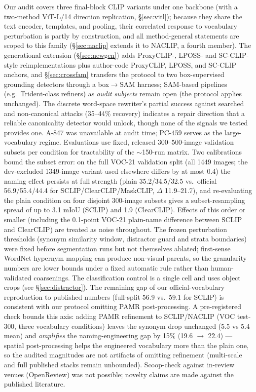\documentclass[11pt]{article}
\newcommand{\miou}{mIoU}
\begin{document}
Our audit covers three final-block CLIP variants under one backbone (with a
two-method ViT-L/14 direction replication, \S\ref{sec:vitl}); because they
share the text encoder, templates, and pooling, their correlated response to
vocabulary perturbation is partly by construction, and all method-general statements
are scoped to this family (\S\ref{sec:naclip} extends it to NACLIP, a fourth member).
The generational extension (\S\ref{sec:newgen}) adds ProxyCLIP-, LPOSS-
and SC-CLIP-style reimplementations plus author-code ProxyCLIP, LPOSS, and SC-CLIP anchors, and
\S\ref{sec:crossfam} transfers the protocol to two box-supervised grounding
detectors through a box$\to$SAM harness; SAM-based pipelines (e.g.\
Trident-class refiners) as \emph{audit subjects}
remain open (the protocol applies unchanged). The discrete word-space
rewriter's partial success against searched and non-canonical attacks
(35--44\% recovery) indicates a repair direction that a reliable
canonicality detector would unlock, though none of the signals we tested
provides one. A-847 was
unavailable at audit time; PC-459 serves as the large-vocabulary regime. Evaluations
use fixed, released 300--500-image validation subsets per condition for tractability
of the $\sim$150-run matrix. Two calibrations bound the subset error: on the full
VOC-21 validation split (all 1449 images; the dev-excluded 1349-image variant
used elsewhere differs by at most 0.4) the naming effect persists at full
strength (plain 35.2/34.5/32.5 vs.\ official 56.9/55.4/44.4 for
SCLIP/ClearCLIP/MaskCLIP,
$\Delta$ 11.9--21.7), and re-evaluating the plain condition on four disjoint 300-image
subsets gives a subset-resampling spread of up to 3.1 \miou{} (SCLIP) and 1.9
(ClearCLIP). Effects of this order or smaller (including the 0.1-point VOC-21
plain-name difference between SCLIP and ClearCLIP) are treated as noise throughout.
The frozen perturbation thresholds (synonym similarity window, distractor guard and
strata boundaries) were fixed before segmentation runs but not themselves ablated;
first-sense WordNet hypernym mapping can produce non-visual parents, so the
granularity numbers are lower bounds under a fixed automatic rule rather than
human-validated coarsenings. The classification control is a single cell and uses
object crops (see \S\ref{sec:distractor}). The remaining gap of our official-vocabulary
reproduction to published numbers (full-split 56.9 vs.\ 59.1 for SCLIP) is consistent
with our protocol omitting PAMR post-processing. A pre-registered check bounds
this axis: adding PAMR refinement to SCLIP/NACLIP (VOC test-300, three
vocabulary conditions) leaves the synonym drop unchanged (5.5 vs 5.4 mean) and
\emph{amplifies} the naming-engineering gap by 15\% (19.6 $\to$ 22.4) --- spatial
post-processing helps the engineered vocabulary more than the plain one, so the
audited magnitudes are not artifacts of omitting refinement (multi-scale and
full published stacks remain unbounded). Scoop-check against in-review venues
(OpenReview) was not possible; novelty claims are made against the published
literature.
\end{document}
